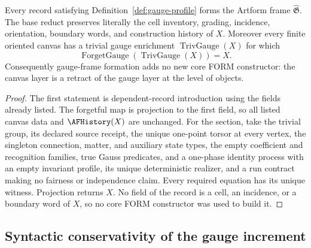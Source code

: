 \begin{theorem}
\label{thm:gauge-frame-conservativity}
Every record satisfying Definition~\ref{def:gauge-profile} forms the Artform
frame $\widehat{\mathfrak G}$.  The base reduct preserves literally the cell
inventory, grading, incidence, orientation, boundary words, and construction
history of $X$.  Moreover every finite oriented canvas has a trivial gauge
enrichment $\operatorname{TrivGauge}(X)$ for which
\[
 \operatorname{ForgetGauge}(\operatorname{TrivGauge}(X))=X.
\]
Consequently gauge-frame formation adds no new core FORM constructor: the
canvas layer is a retract of the gauge layer at the level of objects.
\end{theorem}

\begin{proof}
The first statement is dependent-record introduction using the fields already
listed.  The forgetful map is projection to the first field, so all listed
canvas data and $\AFHistory(X)$ are unchanged.  For the section, take the
trivial group, its declared source receipt, the unique one-point torsor at
every vertex, the singleton connection, matter, and auxiliary state types, the
empty coefficient and recognition families, true Gauss predicates, and a
one-phase identity process with an empty invariant profile, its unique
deterministic realizer, and a run contract making no fairness or independence
claim.  Every required equation has its unique witness.  Projection returns
$X$.  No field of the record is a cell, an incidence, or a boundary word of
$X$, so no core FORM constructor was used to build it.
\end{proof}

\subsection{Syntactic conservativity of the gauge increment}

